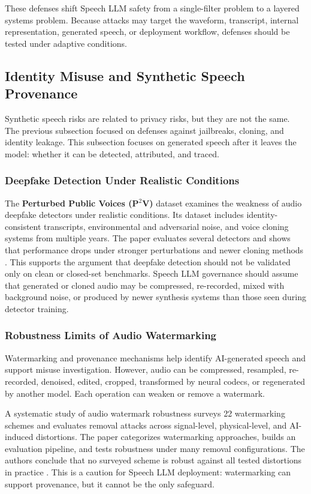 These defenses shift Speech LLM safety from a single-filter problem to a layered systems problem. Because attacks may target the waveform, transcript, internal representation, generated speech, or deployment workflow, defenses should be tested under adaptive conditions.

\subsection{Identity Misuse and Synthetic Speech Provenance}

Synthetic speech risks are related to privacy risks, but they are not the same. The previous subsection focused on defenses against jailbreaks, cloning, and identity leakage. This subsection focuses on generated speech after it leaves the model: whether it can be detected, attributed, and traced.

\subsubsection{Deepfake Detection Under Realistic Conditions}

The \textbf{Perturbed Public Voices (P$^{2}$V)} dataset examines the weakness of audio deepfake detectors under realistic conditions. Its dataset includes identity-consistent transcripts, environmental and adversarial noise, and voice cloning systems from multiple years. The paper evaluates several detectors and shows that performance drops under stronger perturbations and newer cloning methods \citep{gao2025perturbedpublicvoicesp2v}. This supports the argument that deepfake detection should not be validated only on clean or closed-set benchmarks. Speech LLM governance should assume that generated or cloned audio may be compressed, re-recorded, mixed with background noise, or produced by newer synthesis systems than those seen during detector training.

\subsubsection{Robustness Limits of Audio Watermarking}

Watermarking and provenance mechanisms help identify AI-generated speech and support misuse investigation. However, audio can be compressed, resampled, re-recorded, denoised, edited, cropped, transformed by neural codecs, or regenerated by another model. Each operation can weaken or remove a watermark.

A systematic study of audio watermark robustness surveys 22 watermarking schemes and evaluates removal attacks across signal-level, physical-level, and AI-induced distortions. The paper categorizes watermarking approaches, builds an evaluation pipeline, and tests robustness under many removal configurations. The authors conclude that no surveyed scheme is robust against all tested distortions in practice \citep{wen2025sokrobustaudiowatermarking}. This is a caution for Speech LLM deployment: watermarking can support provenance, but it cannot be the only safeguard.

